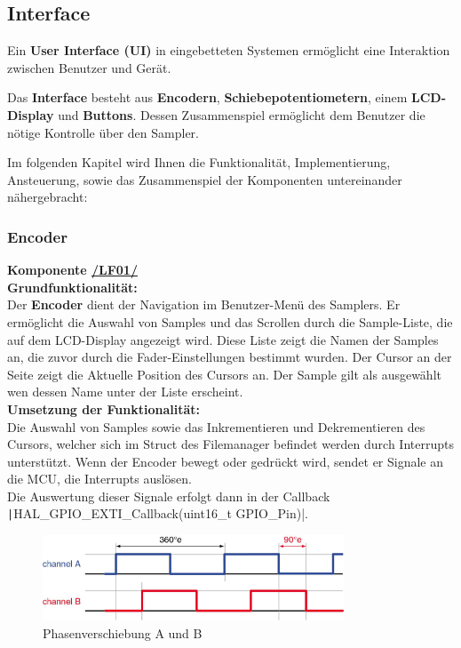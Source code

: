 \subsection{Interface}

Ein\textbf{ User Interface (UI)} in eingebetteten Systemen ermöglicht eine Interaktion zwischen Benutzer und Gerät.

Das \textbf{Interface} besteht aus \textbf{Encodern}, \textbf{Schiebepotentiometern}, einem \textbf{LCD-Display }und \textbf{Buttons}. Dessen Zusammenspiel ermöglicht dem Benutzer die nötige Kontrolle über den Sampler.


Im folgenden Kapitel wird Ihnen die Funktionalität, Implementierung, Ansteuerung, sowie das Zusammenspiel der Komponenten untereinander nähergebracht: 

\subsubsection{Encoder}
\textbf{Komponente \hyperlink{LF01_Link}{/LF01/}} \\

\textbf{Grundfunktionalität:} \\


Der \textbf{Encoder} dient der Navigation im Benutzer-Menü des Samplers. Er ermöglicht die Auswahl von Samples und das Scrollen durch die Sample-Liste, die auf dem LCD-Display angezeigt wird. Diese Liste zeigt die Namen der Samples an, die zuvor durch die Fader-Einstellungen bestimmt wurden. Der Cursor an der Seite zeigt die Aktuelle Position des Cursors an. Der Sample gilt als ausgewählt wen dessen Name unter der Liste erscheint.\\

\textbf{Umsetzung der Funktionalität:} \\

Die Auswahl von Samples sowie das Inkrementieren und Dekrementieren des Cursors, welcher sich im Struct des Filemanager befindet werden durch Interrupts unterstützt. Wenn der Encoder bewegt oder gedrückt wird, sendet er Signale an die MCU, die Interrupts auslösen.\\

Die Auswertung dieser Signale erfolgt dann in der Callback  \texttt|HAL_GPIO_EXTI_Callback(uint16_t GPIO_Pin)|. 

\begin{figure}[H]
	\centering
	\includegraphics[width=0.8\textwidth]{images/08_durchfuehrung/interface/encoder.png}
	\caption{Phasenverschiebung A und B}
	\label{fig:phase_verschiebung}
\end{figure}

